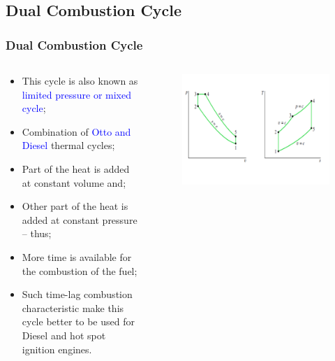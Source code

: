 \documentclass[10pt,compress]{beamer}
\begin{document}
\subsection{Dual Combustion Cycle}
\begin{frame}
 \frametitle{Dual Combustion Cycle}
  \begin{columns}
   \begin{column}[c]{0.45\linewidth}
    \begin{itemize}
     \item <1-> This cycle is also known as \textcolor{blue}{limited pressure or mixed cycle};
     \item <2-> Combination of \textcolor{blue}{Otto and Diesel} thermal cycles;
     \item <3-> Part of the heat is added at constant volume and;
     \item <4-> Other part of the heat is added at constant pressure --  thus;
     \item <5-> More time is available for the combustion of the fuel;
     \item <6-> Such time-lag combustion characteristic make this cycle better to be used for Diesel and hot spot ignition engines. 
    \end{itemize}
   \end{column}
   \begin{column}[c]{0.55\linewidth}
    \begin{figure}%
     \begin{center}
      \includegraphics[width=6.cm,clip]{./Pics/InternalCombustion_IdealDualCombustion}
     \end{center}
    \end{figure}   
   \end{column}  
  \end{columns}
\end{frame}
\end{document}

